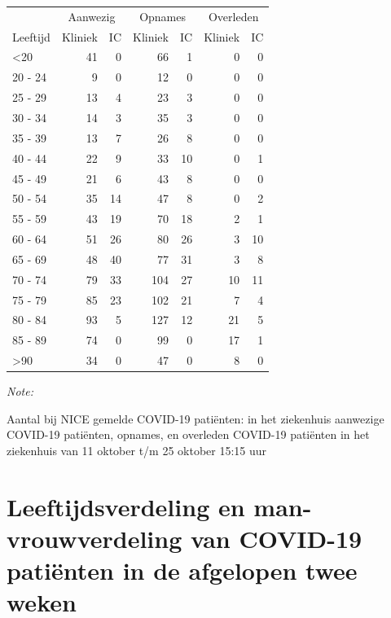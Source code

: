 \documentclass[
  english,
  man,floatsintext]{apa6}
\begin{document}
\begin{table}
\centering\begingroup\fontsize{10}{12}\selectfont

\begin{threeparttable}
\begin{tabular}{lrrrrrr}
\toprule
\multicolumn{1}{c}{ } & \multicolumn{2}{c}{Aanwezig} & \multicolumn{2}{c}{Opnames} & \multicolumn{2}{c}{Overleden} \\
\cmidrule(l{3pt}r{3pt}){2-3} \cmidrule(l{3pt}r{3pt}){4-5} \cmidrule(l{3pt}r{3pt}){6-7}
Leeftijd & Kliniek & IC & Kliniek & IC & Kliniek & IC\\
\midrule
<20 & 41 & 0 & 66 & 1 & 0 & 0\\
20 - 24 & 9 & 0 & 12 & 0 & 0 & 0\\
25 - 29 & 13 & 4 & 23 & 3 & 0 & 0\\
30 - 34 & 14 & 3 & 35 & 3 & 0 & 0\\
35 - 39 & 13 & 7 & 26 & 8 & 0 & 0\\
40 - 44 & 22 & 9 & 33 & 10 & 0 & 1\\
45 - 49 & 21 & 6 & 43 & 8 & 0 & 0\\
50 - 54 & 35 & 14 & 47 & 8 & 0 & 2\\
55 - 59 & 43 & 19 & 70 & 18 & 2 & 1\\
60 - 64 & 51 & 26 & 80 & 26 & 3 & 10\\
65 - 69 & 48 & 40 & 77 & 31 & 3 & 8\\
70 - 74 & 79 & 33 & 104 & 27 & 10 & 11\\
75 - 79 & 85 & 23 & 102 & 21 & 7 & 4\\
80 - 84 & 93 & 5 & 127 & 12 & 21 & 5\\
85 - 89 & 74 & 0 & 99 & 0 & 17 & 1\\
>90 & 34 & 0 & 47 & 0 & 8 & 0\\
\bottomrule
\end{tabular}
\begin{tablenotes}
\item \textit{Note: } 
\item Aantal bij NICE gemelde COVID-19 patiënten: in het ziekenhuis aanwezige COVID-19 patiënten, opnames, en overleden COVID-19 patiënten in het ziekenhuis van 11 oktober t/m 25 oktober 15:15 uur
\end{tablenotes}
\end{threeparttable}
\endgroup{}
\end{table}

\newpage

\hypertarget{leeftijdsverdeling-en-man-vrouwverdeling-van-covid-19-patiuxebnten-in-de-afgelopen-twee-weken}{%
\section{Leeftijdsverdeling en man-vrouwverdeling van COVID-19 patiënten in de afgelopen twee weken}\label{leeftijdsverdeling-en-man-vrouwverdeling-van-covid-19-patiuxebnten-in-de-afgelopen-twee-weken}}
\end{document}
